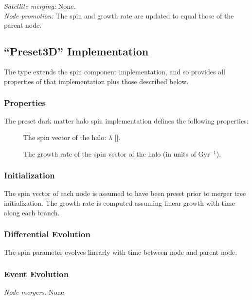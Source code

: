 \noindent\emph{Satellite merging:} None.\\

\noindent\emph{Node promotion:} The spin and growth rate are updated to equal those of the parent node.\\

\subsection{``Preset3D'' Implementation}

The type extends the  spin component implementation, and so provides all properties of that implementation plus those described below.

\subsubsection{Properties}

The preset dark matter halo spin implementation defines the following properties:
\begin{description}
 \item [] The spin vector of the halo: $\lambda$ [].
 \item [] The growth rate of the spin vector of the halo (in units of Gyr$^{-1}$).
\end{description}

\subsubsection{Initialization}

The spin vector of each \gls{node} is assumed to have been preset prior to merger tree initialization. The growth rate is computed assuming linear growth with time along each branch.

\subsubsection{Differential Evolution}

The spin parameter evolves linearly with time between \gls{node} and parent node.

\subsubsection{Event Evolution}

\noindent\emph{Node mergers:} None.\\

